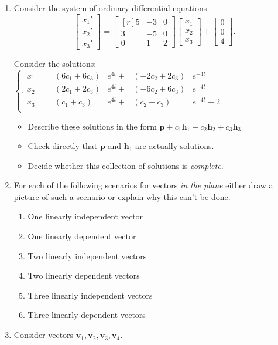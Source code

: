 \documentclass[12pt]{article}
\begin{document}
\begin{enumerate}[1.]
\item Consider the system of ordinary differential equations
\[
  \begin{bmatrix}x_1'\\x_2'\\x_3'\end{bmatrix}
    =
  \begin{bmatrix*}[r]5&-3&0\\3&-5&0\\0&1&2\end{bmatrix*}
  \begin{bmatrix}x_1\\x_2\\x_3\end{bmatrix}
      +
      \begin{bmatrix}0\\0\\4\end{bmatrix}.
    \]

Consider the solutions:    
\(\left \{.\begin{aligned} 
x_1&=&(6c_1+6c_3)&e^{4t}+&(-2c_2+2c_3)&e^{-4t}\\
x_2&=&(2c_1+2c_3)&e^{4t}+&(-6c_2+6c_3)&e^{-4t}\\
x_3&=&(c_1+c_3)  &e^{4t}+&(c_2-c_3)   &e^{-4t}-2\\
\end{aligned} \right.\)
    
\begin{itemize}
\item Describe these solutions in the form \(\mathbf{p} + c_1\mathbf{h}_1 + c_2 \mathbf{h}_2 + c_3 \mathbf{h}_3\)
  \vfill
\item Check directly that \(\mathbf{p}\)   and \(\mathbf{h}_1\) are actually solutions.
  \vfill
\item Decide whether this collection of solutions is \emph{complete.}
  \vfill
\end{itemize}

\newpage
\item For each of the following scenarios for vectors \emph{in the plane} either draw a picture of such a scenario or explain why this can't be done.
\begin{enumerate}
\item One linearly independent vector
\vfill    
\item One linearly dependent vector
\vfill    
\item Two linearly independent vectors
\vfill    
\item Two linearly dependent vectors
\vfill    
\item Three linearly independent vectors
\vfill    
\item Three linearly dependent vectors
\vfill  
\end{enumerate}
\newpage
\item Consider vectors \(\mathbf{v}_1,\mathbf{v}_2,\mathbf{v}_3,\mathbf{v}_4\).


\end{enumerate}
\end{document}
